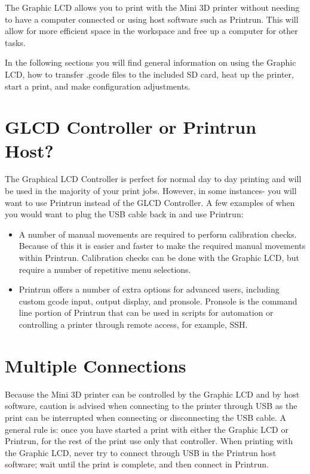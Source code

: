 %
%
%
%
%
%
%

The Graphic LCD allows you to print with the Mini 3D printer without needing to have a computer connected or using host software such as Printrun. This will allow for more efficient space in the workspace and free up a computer for other tasks.

In the following sections you will find general information on using the Graphic LCD, how to transfer .gcode files to the included SD card, heat up the printer, start a print, and make configuration adjustments.

\section{GLCD Controller or Printrun Host?}
\label{sec:Graphic LCD or Printrun Host?}
The Graphical LCD Controller is perfect for normal day to day printing and will be used in the majority of your print jobs. However, in some instances- you will want to use Printrun instead of the GLCD Controller. A few examples of when you would want to plug the USB cable back in and use Printrun:
\begin{itemize}
	\item A number of manual movements are required to perform calibration checks. Because of this it is easier and faster to make the required manual movements within Printrun. Calibration checks can be done with the Graphic LCD, but require a number of repetitive menu selections.
	\item Printrun offers a number of extra options for advanced users, including custom gcode input, output display, and pronsole. Pronsole is the command line portion of Printrun that can be used in scripts for automation or controlling a printer through remote access, for example, SSH.
\end{itemize}

\section{Multiple Connections}
Because the Mini 3D printer can be controlled by the Graphic LCD and by host software, caution is advised when connecting to the printer through USB as the print can be interrupted when connecting or disconnecting the USB cable. A general rule is: once you have started a print with either the Graphic LCD or Printrun, for the rest of the print use only that controller. When printing with the Graphic LCD, never try to connect through USB in the Printrun host software; wait until the print is complete, and then connect in Printrun.

